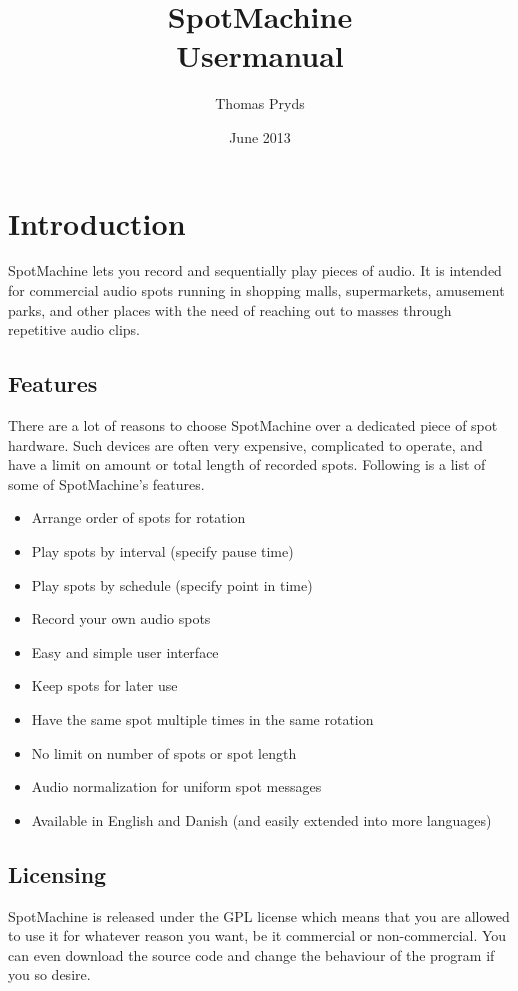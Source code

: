 \documentclass[a4paper,12pt]{report}
\title{SpotMachine \\ Usermanual}
\author{Thomas Pryds}
\date{June 2013}
\begin{document}
\maketitle

\tableofcontents

\chapter{Introduction}

SpotMachine lets you record and sequentially play pieces of audio. It is
intended for commercial audio spots running in shopping malls, supermarkets,
amusement parks, and other places with the need of reaching out to masses
through repetitive audio clips.

\section{Features}
There are a lot of reasons to choose SpotMachine over a dedicated piece of spot
hardware. Such devices are often very expensive, complicated to operate, and
have a limit on amount or total length of recorded spots. Following is a list of
some of SpotMachine's features.

\begin{itemize}
\item Arrange order of spots for rotation
\item Play spots by interval (specify pause time)
\item Play spots by schedule (specify point in time)
\item Record your own audio spots
\item Easy and simple user interface
\item Keep spots for later use
\item Have the same spot multiple times in the same rotation
\item No limit on number of spots or spot length
\item Audio normalization for uniform spot messages
\item Available in English and Danish (and easily extended into more languages)
\end{itemize}

\section{Licensing}
SpotMachine is released under the GPL license which means that you are allowed
to use it for whatever reason you want, be it commercial or non-commercial. You
can even download the source code and change the behaviour of the program if you
so desire.
\end{document}
